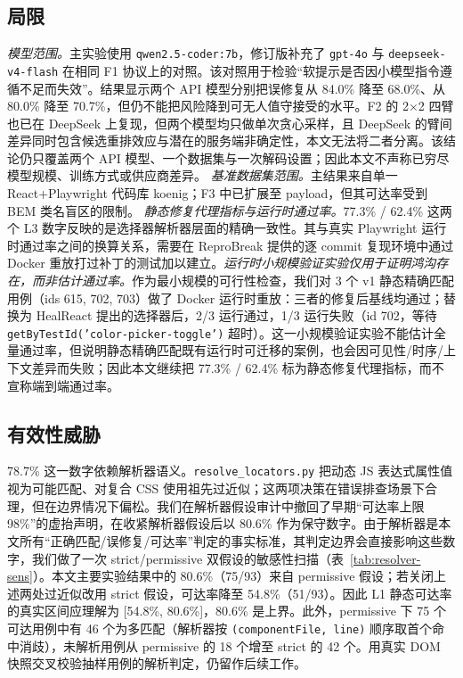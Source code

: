 \subsection{局限}
\textit{模型范围。}主实验使用 \texttt{qwen2.5-coder:7b}，修订版补充了 \texttt{gpt-4o} 与 \texttt{deepseek-v4-flash} 在相同 F1 协议上的对照。该对照用于检验“软提示是否因小模型指令遵循不足而失效”。结果显示两个 API 模型分别把误修复从 84.0\% 降至 68.0\%、从 80.0\% 降至 70.7\%，但仍不能把风险降到可无人值守接受的水平。F2 的 2$\times$2 四臂也已在 DeepSeek 上复现，但两个模型均只做单次贪心采样，且 DeepSeek 的臂间差异同时包含候选重排效应与潜在的服务端非确定性，本文无法将二者分离。该结论仍只覆盖两个 API 模型、一个数据集与一次解码设置；因此本文不声称已穷尽模型规模、训练方式或供应商差异。
\textit{基准数据集范围。}主结果来自单一 React+Playwright 代码库 koenig；F3 中已扩展至 payload，但其可达率受到 BEM 类名盲区的限制。
\textit{静态修复代理指标与运行时通过率。}77.3\% / 62.4\% 这两个 L3 数字反映的是选择器解析器层面的精确一致性。其与真实 Playwright 运行时通过率之间的换算关系，需要在 ReproBreak 提供的逐 commit 复现环境中通过 Docker 重放打过补丁的测试加以建立。\textit{运行时小规模验证实验仅用于证明鸿沟存在，而非估计通过率。}作为最小规模的可行性检查，我们对 3 个 v1 静态精确匹配用例（ids 615, 702, 703）做了 Docker 运行时重放：三者的修复后基线均通过；替换为 HealReact 提出的选择器后，2/3 运行通过，1/3 运行失败（id 702，等待 \texttt{getByTestId('color-picker-toggle')} 超时）。这一小规模验证实验不能估计全量通过率，但说明静态精确匹配既有运行时可迁移的案例，也会因可见性/时序/上下文差异而失败；因此本文继续把 77.3\% / 62.4\% 标为静态修复代理指标，而不宣称端到端通过率。

\subsection{有效性威胁}
78.7\% 这一数字依赖解析器语义。\texttt{resolve\_locators.py} 把动态 JS 表达式属性值视为可能匹配、对复合 CSS 使用祖先过近似；这两项决策在错误排查场景下合理，但在边界情况下偏松。我们在解析器假设审计中撤回了早期“可达率上限 98\%”的虚抬声明，在收紧解析器假设后以 80.6\% 作为保守数字。由于解析器是本文所有“正确匹配/误修复/可达率”判定的事实标准，其判定边界会直接影响这些数字，我们做了一次 strict/permissive 双假设的敏感性扫描（表~\ref{tab:resolver-sens}）。本文主要实验结果中的 80.6\%（75/93）来自 permissive 假设；若关闭上述两处过近似改用 strict 假设，可达率降至 54.8\%（51/93）。因此 L1 静态可达率的真实区间应理解为 [54.8\%, 80.6\%]，80.6\% 是上界。此外，permissive 下 75 个可达用例中有 46 个为多匹配（解析器按 \texttt{(componentFile, line)} 顺序取首个命中消歧），未解析用例从 permissive 的 18 个增至 strict 的 42 个。用真实 DOM 快照交叉校验抽样用例的解析判定，仍留作后续工作。

